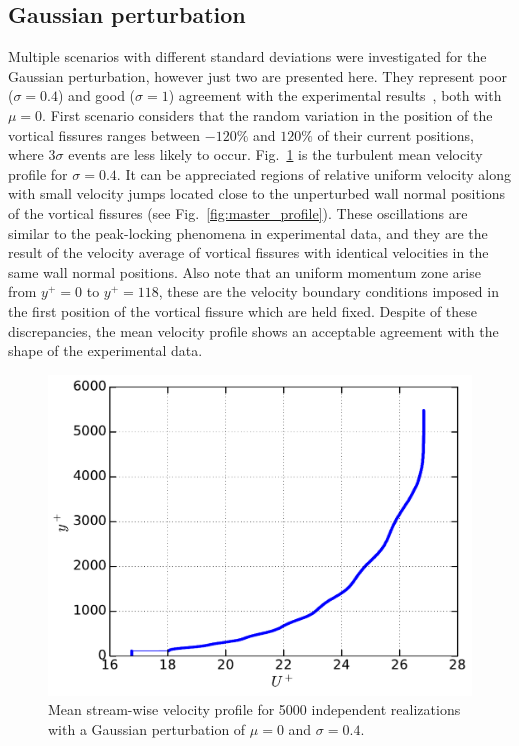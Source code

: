 \documentclass[aps,reprint,amsmath,amssymb,pra]{revtex4-1}%
\begin{document}
\subsection{Gaussian perturbation}
Multiple scenarios with different standard deviations were investigated for the Gaussian perturbation, however just two are presented here. They represent poor ($\sigma=0.4$) and good ($\sigma=1$) agreement with the experimental results~\cite{Vincenti2013,FLM}, both with $\mu=0$. First scenario considers that the random variation in the position of the vortical fissures ranges between $-120\%$ and $120\%$ of their current positions, where $3\sigma$ events are less likely to occur. Fig.~\ref{fig:mean_profile} is the turbulent mean velocity profile for $\sigma=0.4$. It can be appreciated regions of relative uniform velocity along with small velocity jumps located close to the unperturbed wall normal positions of the vortical fissures (see Fig.~\ref{fig:master_profile}). These oscillations are similar to the peak-locking phenomena in experimental data, and they are the result of  the velocity average of vortical fissures with identical velocities in the same wall normal positions. Also note that an uniform momentum zone arise from $y^+=0$ to $y^+=118$, these are the velocity boundary conditions imposed in the first position of the vortical fissure which are held fixed. Despite of these discrepancies, the mean velocity profile shows an acceptable agreement with the shape of the experimental data.\\
\begin{figure}[b]
\includegraphics[scale=0.45]{figures/Master_averaged_step_profile_5000_assembles}
\caption{\label{fig:mean_profile} Mean stream-wise velocity profile for 5000 independent realizations with a Gaussian perturbation of $\mu=0$ and $\sigma=0.4$.}
\end{figure}
\end{document}
